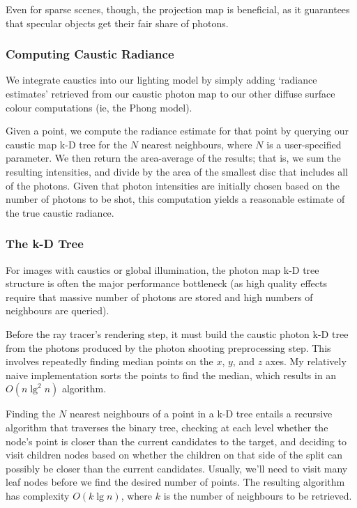 \documentclass{article}
\begin{document}
Even for sparse scenes, though, the projection map is beneficial, as it guarantees that specular objects get their fair share of photons.

\subsubsection{Computing Caustic Radiance}

We integrate caustics into our lighting model by simply adding `radiance
estimates' retrieved from our caustic photon map to our other diffuse surface
colour computations (ie, the Phong model).

Given a point, we compute the radiance estimate for that point by querying our
caustic map k-D tree for the $N$ nearest neighbours, where $N$ is a
user-specified parameter. We then return the area-average of the results; that
is, we sum the resulting intensities, and divide by the area
of the smallest disc that includes all of the photons. Given that photon
intensities are initially chosen based on the number of photons to be shot, this
computation yields a reasonable estimate of the true caustic radiance.

\subsubsection{The k-D Tree}

For images with caustics or global illumination, the photon map k-D tree
structure is often the major performance bottleneck (as high quality
effects require that massive number of photons are stored and high numbers of
neighbours are queried).


Before the ray tracer's rendering step, it must build the caustic photon k-D
tree from the photons produced by the photon shooting preprocessing step.
This involves repeatedly finding median points on the $x$, $y$, and $z$ axes. My
relatively naive implementation sorts the points to find the median, which
results in an $O(n\lg^2{n})$ algorithm.

Finding the $N$ nearest neighbours of a point in a k-D tree entails a recursive
algorithm that traverses the binary tree, checking at each level whether the
node's point is closer than the current candidates to the target, and deciding
to visit children nodes based on whether the children on that side of the split
can possibly be closer than the current candidates. Usually, we'll need to visit
many leaf nodes before we find the desired number of points. The resulting
algorithm has complexity $O(k\lg{n})$, where $k$ is the number of neighbours to
be retrieved.
\end{document}
